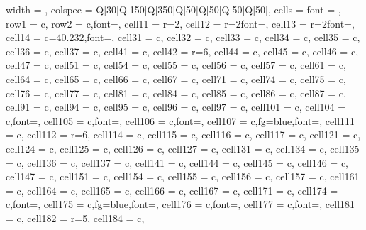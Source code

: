 \begin{longtblr}[
  label = none,
  entry = none,
  note{} = {\emph{Note: The evaluation (ranking) uses a score scale (1-5), where 1
represents the lowest score and 5 the highest. The scores may be fuzzy,
i.e., expressed as fuzzy numbers.}},
]{
  width = \linewidth,
  colspec = {Q[30]Q[150]Q[350]Q[50]Q[50]Q[50]Q[50]},
  cells = {font = \small},
  row{1} = {c},
  row{2} = {c,font=\bfseries\small},
  cell{1}{1} = {r=2}{},
  cell{1}{2} = {r=2}{font=\bfseries\small},
  cell{1}{3} = {r=2}{font=\bfseries\small},
  cell{1}{4} = {c=4}{0.232\linewidth,font=\bfseries\small},
  cell{3}{1} = {c},
  cell{3}{2} = {c},
  cell{3}{3} = {c},
  cell{3}{4} = {c},
  cell{3}{5} = {c},
  cell{3}{6} = {c},
  cell{3}{7} = {c},
  cell{4}{1} = {c},
  cell{4}{2} = {r=6}{},
  cell{4}{4} = {c},
  cell{4}{5} = {c},
  cell{4}{6} = {c},
  cell{4}{7} = {c},
  cell{5}{1} = {c},
  cell{5}{4} = {c},
  cell{5}{5} = {c},
  cell{5}{6} = {c},
  cell{5}{7} = {c},
  cell{6}{1} = {c},
  cell{6}{4} = {c},
  cell{6}{5} = {c},
  cell{6}{6} = {c},
  cell{6}{7} = {c},
  cell{7}{1} = {c},
  cell{7}{4} = {c},
  cell{7}{5} = {c},
  cell{7}{6} = {c},
  cell{7}{7} = {c},
  cell{8}{1} = {c},
  cell{8}{4} = {c},
  cell{8}{5} = {c},
  cell{8}{6} = {c},
  cell{8}{7} = {c},
  cell{9}{1} = {c},
  cell{9}{4} = {c},
  cell{9}{5} = {c},
  cell{9}{6} = {c},
  cell{9}{7} = {c},
  cell{10}{1} = {c},
  cell{10}{4} = {c,font=\bfseries\small},
  cell{10}{5} = {c,font=\bfseries\small},
  cell{10}{6} = {c,font=\bfseries\small},
  cell{10}{7} = {c,fg=blue,font=\bfseries\small},
  cell{11}{1} = {c},
  cell{11}{2} = {r=6}{},
  cell{11}{4} = {c},
  cell{11}{5} = {c},
  cell{11}{6} = {c},
  cell{11}{7} = {c},
  cell{12}{1} = {c},
  cell{12}{4} = {c},
  cell{12}{5} = {c},
  cell{12}{6} = {c},
  cell{12}{7} = {c},
  cell{13}{1} = {c},
  cell{13}{4} = {c},
  cell{13}{5} = {c},
  cell{13}{6} = {c},
  cell{13}{7} = {c},
  cell{14}{1} = {c},
  cell{14}{4} = {c},
  cell{14}{5} = {c},
  cell{14}{6} = {c},
  cell{14}{7} = {c},
  cell{15}{1} = {c},
  cell{15}{4} = {c},
  cell{15}{5} = {c},
  cell{15}{6} = {c},
  cell{15}{7} = {c},
  cell{16}{1} = {c},
  cell{16}{4} = {c},
  cell{16}{5} = {c},
  cell{16}{6} = {c},
  cell{16}{7} = {c},
  cell{17}{1} = {c},
  cell{17}{4} = {c,font=\bfseries\small},
  cell{17}{5} = {c,fg=blue,font=\bfseries\small},
  cell{17}{6} = {c,font=\bfseries\small},
  cell{17}{7} = {c,font=\bfseries\small},
  cell{18}{1} = {c},
  cell{18}{2} = {r=5}{},
  cell{18}{4} = {c},
}
\end{longtblr}
